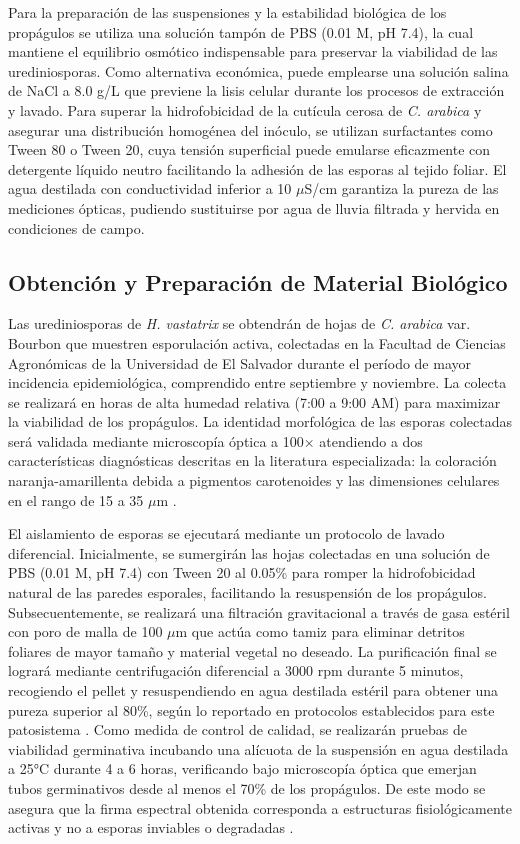 \documentclass[12pt, a4paper]{article}
\begin{document}
	Para la preparación de las suspensiones y la estabilidad biológica de los propágulos se utiliza una solución tampón de PBS (0.01 M, pH 7.4), la cual mantiene el equilibrio osmótico indispensable para preservar la viabilidad de las urediniosporas. Como alternativa económica, puede emplearse una solución salina de NaCl a 8.0 g/L que previene la lisis celular durante los procesos de extracción y lavado. Para superar la hidrofobicidad de la cutícula cerosa de \textit{C. arabica} y asegurar una distribución homogénea del inóculo, se utilizan surfactantes como Tween 80 o Tween 20, cuya tensión superficial puede emularse eficazmente con detergente líquido neutro facilitando la adhesión de las esporas al tejido foliar. El agua destilada con conductividad inferior a 10 $\mu$S/cm garantiza la pureza de las mediciones ópticas, pudiendo sustituirse por agua de lluvia filtrada y hervida en condiciones de campo.
	
	\subsection{Obtención y Preparación de Material Biológico}
	
	Las urediniosporas de \textit{H. vastatrix} se obtendrán de hojas de \textit{C. arabica} var. Bourbon que muestren esporulación activa, colectadas en la Facultad de Ciencias Agronómicas de la Universidad de El Salvador durante el período de mayor incidencia epidemiológica, comprendido entre septiembre y noviembre. La colecta se realizará en horas de alta humedad relativa (7:00 a 9:00 AM) para maximizar la viabilidad de los propágulos. La identidad morfológica de las esporas colectadas será validada mediante microscopía óptica a 100× atendiendo a dos características diagnósticas descritas en la literatura especializada: la coloración naranja-amarillenta debida a pigmentos carotenoides y las dimensiones celulares en el rango de 15 a 35 $\mu$m \parencite{Cummins2003, Britton1995}.
	
	El aislamiento de esporas se ejecutará mediante un protocolo de lavado diferencial. Inicialmente, se sumergirán las hojas colectadas en una solución de PBS (0.01 M, pH 7.4) con Tween 20 al 0.05\% para romper la hidrofobicidad natural de las paredes esporales, facilitando la resuspensión de los propágulos. Subsecuentemente, se realizará una filtración gravitacional a través de gasa estéril con poro de malla de 100 $\mu$m que actúa como tamiz para eliminar detritos foliares de mayor tamaño y material vegetal no deseado. La purificación final se logrará mediante centrifugación diferencial a 3000 rpm durante 5 minutos, recogiendo el pellet y resuspendiendo en agua destilada estéril para obtener una pureza superior al 80\%, según lo reportado en protocolos establecidos para este patosistema \parencite{Silva2006}. Como medida de control de calidad, se realizarán pruebas de viabilidad germinativa incubando una alícuota de la suspensión en agua destilada a 25°C durante 4 a 6 horas, verificando bajo microscopía óptica que emerjan tubos germinativos desde al menos el 70\% de los propágulos. De este modo se asegura que la firma espectral obtenida corresponda a estructuras fisiológicamente activas y no a esporas inviables o degradadas \parencite{Money2016}.
	
\end{document}
